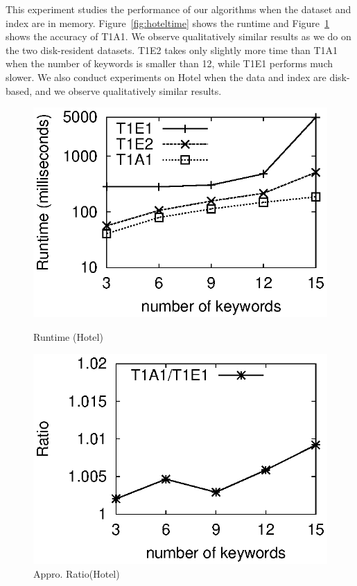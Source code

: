 \documentclass{sig-alternate}
\begin{document}
 This
experiment studies the performance of our algorithms when the
dataset and index are in memory.
%
Figure~\ref{fig:hoteltime} shows the runtime and
Figure~\ref{fig:hotelratio} shows the accuracy of T1A1.
%
We observe qualitatively similar results as we do on the two
disk-resident datasets.
%
T1E2 takes only slightly more time than T1A1 when the number of keywords
is smaller than 12, while T1E1 performs much slower.
%
We also conduct experiments on \textsf{Hotel} when the data and
index are disk-based, and we observe qualitatively similar results.


\begin{figure}[h]
\vspace{-1ex}
\begin{minipage}[bt]{1.6in}
 \includegraphics[scale=0.5]{figure/Hoteltime}\vspace{-2ex}
\caption{Runtime (Hotel)} \label{fig:hoteltime}
\end{minipage}\hspace{1mm}
\begin{minipage}[bt]{1.6in}
 \includegraphics[scale=0.5]{figure/Hotelratio}\vspace{-2ex}
\caption{Appro. Ratio(Hotel)} \label{fig:hotelratio}
\end{minipage}
\end{figure}
\end{document}
